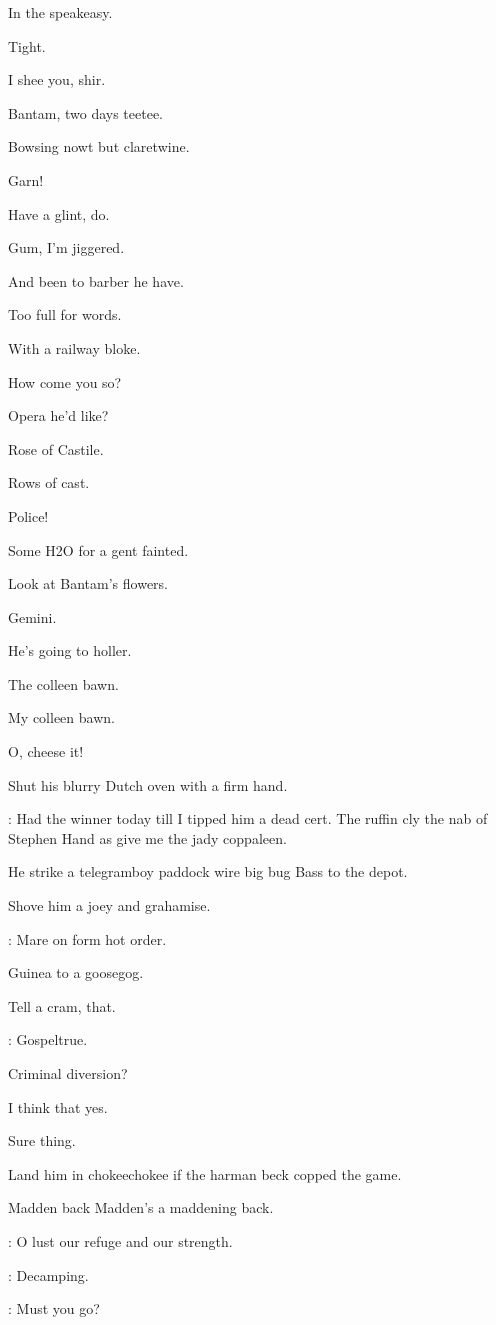 In the speakeasy.

Tight.

I shee you,
shir.

Bantam,
two days teetee.

Bowsing nowt but claretwine.

Garn!

Have a glint,
do.

Gum,
I'm jiggered.

And been to barber he have.

Too full for words.

With a railway bloke.

How come you so?

Opera he'd like?

Rose of Castile.

Rows of cast.

Police!

Some H2O for a gent fainted.

Look at Bantam's flowers.

Gemini.

He's going to holler.

The colleen bawn.

My colleen bawn.

O,
cheese it!

Shut his blurry Dutch oven with a firm hand.

\lenehan:
Had the winner today till I tipped him a dead cert.
The ruffin cly the nab of Stephen Hand as give me the jady coppaleen.

He strike a telegramboy paddock wire big bug Bass to the depot.

Shove him a joey and grahamise.

\lenehan:
Mare on form hot order.

Guinea to a goosegog.

Tell a cram,
that.

\lenehan:
Gospeltrue.

Criminal diversion?

I think that yes.

Sure thing.

Land him in chokeechokee if the harman beck copped the game.

Madden back Madden's a maddening back.

\lynch:
O lust our refuge and our strength.

\madden:
Decamping.

\bannon:
Must you go?

